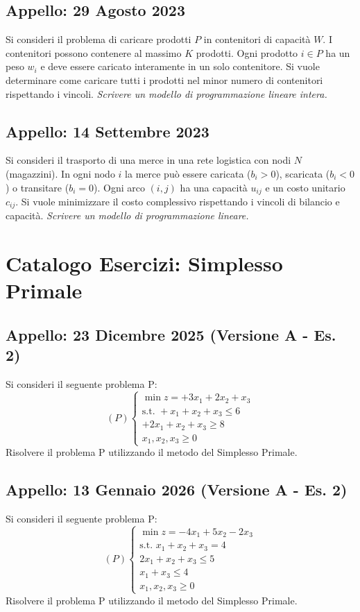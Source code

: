 \documentclass[11pt, a4paper]{article}
\begin{document}
\subsection{Appello: 29 Agosto 2023}
Si consideri il problema di caricare prodotti $P$ in contenitori di capacità $W$. I contenitori possono contenere al massimo $K$ prodotti. Ogni prodotto $i \in P$ ha un peso $w_i$ e deve essere caricato interamente in un solo contenitore. Si vuole determinare come caricare tutti i prodotti nel minor numero di contenitori rispettando i vincoli.
\textit{Scrivere un modello di programmazione lineare intera.}

\subsection{Appello: 14 Settembre 2023}
Si consideri il trasporto di una merce in una rete logistica con nodi $N$ (magazzini). In ogni nodo $i$ la merce può essere caricata ($b_i > 0$), scaricata ($b_i < 0$) o transitare ($b_i = 0$). Ogni arco $(i,j)$ ha una capacità $u_{ij}$ e un costo unitario $c_{ij}$. Si vuole minimizzare il costo complessivo rispettando i vincoli di bilancio e capacità.
\textit{Scrivere un modello di programmazione lineare.}

\newpage
\section{Catalogo Esercizi: Simplesso Primale}

\subsection{Appello: 23 Dicembre 2025 (Versione A - Es. 2)}
Si consideri il seguente problema P:
\[ (P) \begin{cases} \min z = +3x_1 + 2x_2 + x_3 \\ \text{s.t. } +x_1 + x_2 + x_3 \le 6 \\ +2x_1 + x_2 + x_3 \ge 8 \\ x_1, x_2, x_3 \ge 0 \end{cases} \]
Risolvere il problema P utilizzando il metodo del Simplesso Primale.

\subsection{Appello: 13 Gennaio 2026 (Versione A - Es. 2)}
Si consideri il seguente problema P:
\[ (P) \begin{cases} \min z = -4x_1 + 5x_2 - 2x_3 \\ \text{s.t. } x_1 + x_2 + x_3 = 4 \\ 2x_1 + x_2 + x_3 \le 5 \\ x_1 + x_3 \le 4 \\ x_1, x_2, x_3 \ge 0 \end{cases} \]
Risolvere il problema P utilizzando il metodo del Simplesso Primale.
\end{document}

